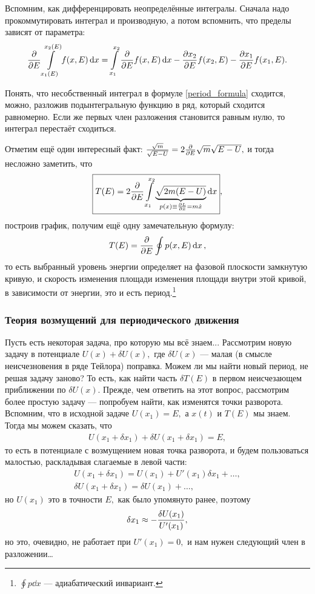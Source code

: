\documentclass[12pt, a4paper]{article}
\begin{document}
Вспомним, как дифференцировать неопределённые интегралы. Сначала надо прокоммутировать интеграл и производную, а потом вспомнить, что пределы зависят от параметра:
\begin{equation}
\pdv{E} \int\limits_{x_1 (E)}^{x_2 (E)} f(x, E) \dd{x} = \int\limits_{x_1}^{x_2} \pdv{E} f(x, E) \dd{x} - \pdv{x_2}{E} f(x_2, E) - \pdv{x_1}{E} f(x_1, E).
\end{equation}

Понять, что несобственный интеграл в формуле \eqref{period_formula} сходится, можно, разложив подынтегральную функцию в ряд, который сходится равномерно. Если же первых член разложения становится равным нулю, то интеграл перестаёт сходиться.

Отметим ещё один интересный факт: $\frac{\sqrt{m}}{\sqrt{E - U}} = 2 \pdv{E} \sqrt{m} \sqrt{E - U},$ и тогда несложно заметить, что
\begin{equation}
 \boxed{T(E) = 2 \pdv{E}  \int\limits_{x_1}^{x_2} \underbrace{\sqrt{2m (E- U)} }_{p(x) \equiv \pdv{L}{\dot{x}} = m\dot{x}}\dd{x}}, \label{T_from_E}
 \end{equation} 
 построив график, получим ещё одну замечательную формулу:
 \begin{equation}
 T(E) = \pdv{E} \oint p(x, E) \dd{x},
 \end{equation}
 то есть выбранный уровень энергии определяет на фазовой плоскости замкнутую кривую, и скорость изменения площади изменения площади внутри этой кривой, в зависимости от энергии, это и есть период.\footnote{$\oint p \dd{x}$ --- адиабатический инвариант. }
 
\subsubsection{Теория возмущений для периодического движения}
Пусть есть некоторая задача, про которую мы всё знаем...
Рассмотрим новую задачу в потенциале $U(x)  + \delta U(x),$ где $\delta U(x)$ --- малая (в смысле неисчезновения в ряде Тейлора) поправка. Можем ли мы найти новый период, не решая задачу заново? То есть, как найти часть $\delta T(E)$ в первом неисчезающем приближении по $\delta U(x)$. Прежде, чем ответить на этот вопрос, рассмотрим более простую задачу --- попробуем найти, как изменятся точки разворота. Вспомним, что в исходной задаче $U(x_1) = E,$ а $x(t)$ и $T(E)$ мы знаем. Тогда мы можем сказать, что 
\begin{gather}
U(x_1 + \delta x_1) + \delta U(x_1 + \delta x_1) = E,
\end{gather}
то есть в потенциале с возмущением новая точка разворота, и будем пользоваться малостью, раскладывая слагаемые в левой части:
\begin{gather}
U(x_1 + \delta x_1) = U(x_1) + U'(x_1) \delta x_1 + \ldots,\\
\delta U(x_1 + \delta x_1) = \delta U(x_1) + \ldots,
\end{gather}
но $U(x_1)$ это в точности $E,$ как было упомянуто ранее, поэтому 
\begin{equation}
\var{x_1} \approx - \frac{\var{U(x_1)}}{U'(x_1)},
\end{equation}
но это, очевидно, не работает при $U'(x_1) = 0,$ и нам нужен следующий член в разложении\dots
\end{document}
